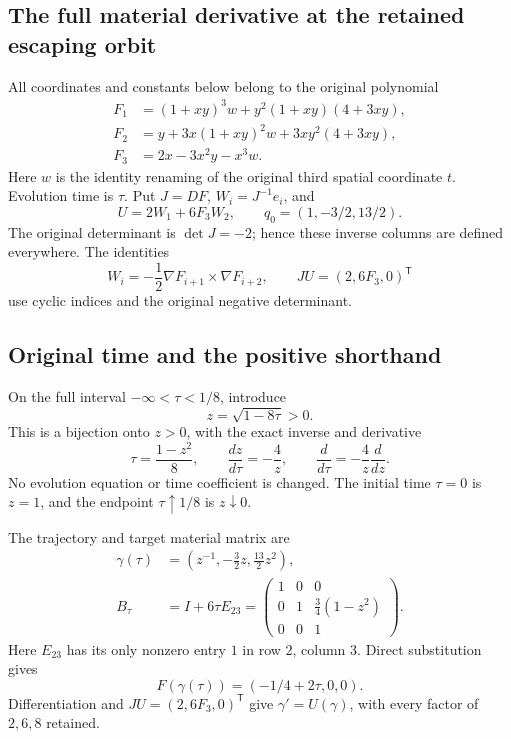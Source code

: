 \subsection{The full material derivative at the retained escaping orbit}
\label{sec:material-endpoint}

All coordinates and constants below belong to the original polynomial
\[
\begin{aligned}
F_1&=(1+xy)^3w+y^2(1+xy)(4+3xy),\\
F_2&=y+3x(1+xy)^2w+3xy^2(4+3xy),\\
F_3&=2x-3x^2y-x^3w.
\end{aligned}
\]
Here \(w\) is the identity renaming of the original third spatial coordinate
\(t\). Evolution time is \(\tau\). Put \(J=DF\), \(W_i=J^{-1}e_i\), and
\[
U=2W_1+6F_3W_2,\qquad q_0=(1,-3/2,13/2).
\]
The original determinant is \(\det J=-2\); hence these inverse columns are
defined everywhere. The identities
\[
W_i=-\frac12\nabla F_{i+1}\times\nabla F_{i+2},\qquad
JU=(2,6F_3,0)^{\mathsf T}
\]
use cyclic indices and the original negative determinant.

\subsection{Original time and the positive shorthand}

On the full interval \(-\infty<\tau<1/8\), introduce
\[
z=\sqrt{1-8\tau}>0.
\]
This is a bijection onto \(z>0\), with the exact inverse and derivative
\[
\tau=\frac{1-z^2}{8},\qquad
\frac{dz}{d\tau}=-\frac4z,\qquad
\frac d{d\tau}=-\frac4z\frac d{dz}.
\]
No evolution equation or time coefficient is changed. The initial time
\(\tau=0\) is \(z=1\), and the endpoint \(\tau\uparrow1/8\) is
\(z\downarrow0\).

The trajectory and target material matrix are
\[
\begin{aligned}
\gamma(\tau)&=\left(z^{-1},-\frac32z,\frac{13}{2}z^2\right),\\
B_\tau&=I+6\tau E_{23}
=\begin{pmatrix}
1&0&0\\0&1&\frac34(1-z^2)\\0&0&1
\end{pmatrix}.
\end{aligned}
\]
Here \(E_{23}\) has its only nonzero entry \(1\) in row \(2\), column \(3\).
Direct substitution gives
\[
F(\gamma(\tau))=(-1/4+2\tau,0,0).
\]
Differentiation and \(JU=(2,6F_3,0)^{\mathsf T}\) give
\(\gamma'=U(\gamma)\), with every factor of \(2,6,8\) retained.

